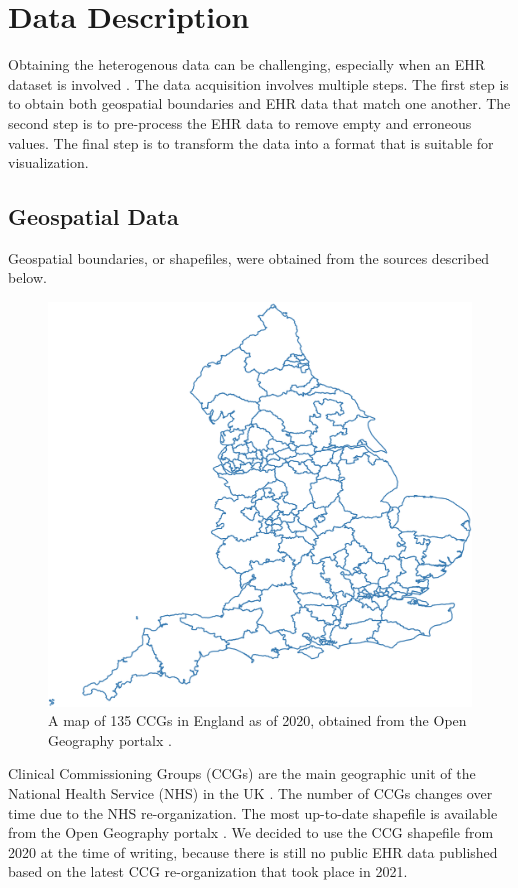 \section{Data Description}

Obtaining the heterogenous data can be challenging, especially when an EHR dataset is involved \cite{wang2021EHRa}. The data acquisition involves multiple steps. The first step is to obtain both geospatial boundaries and EHR data that match one another. The second step is to pre-process the EHR data to remove empty and erroneous values. The final step is to transform the data into a format that is suitable for visualization.

\subsection{Geospatial Data}

Geospatial boundaries, or shapefiles, were obtained from the sources described below.
{
\begin{figure}[tb!]
    \centering
    \includegraphics[width=0.6\columnwidth]{figure/ccg.png}
    \caption{A map of 135 CCGs in England as of 2020, obtained from the Open Geography portalx \cite{opengeographyportalxOpen}.}
    \label{fig:ccg}
\end{figure}
}


Clinical Commissioning Groups (CCGs) are the main geographic unit of the National Health Service (NHS) in the UK \cite{nhsNHS}. The number of CCGs changes over time due to the NHS re-organization. The most up-to-date shapefile is available from the Open Geography portalx \cite{opengeographyportalxOpen}. We decided to use the CCG shapefile from 2020 at the time of writing, because there is still no public EHR data published based on the latest CCG re-organization that took place in 2021.


